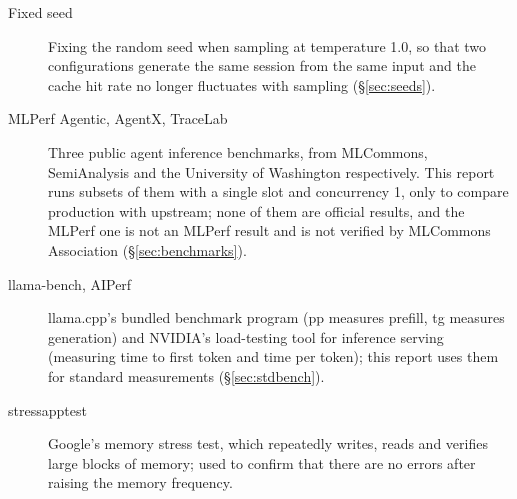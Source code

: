 \documentclass[11pt,a4paper]{article}
\begin{document}
\begin{description}
  \item[Fixed seed] Fixing the random seed when sampling at temperature 1.0, so that two configurations generate the same session from the same input and the cache hit rate no longer fluctuates with sampling (\S\ref{sec:seeds}).
  \item[MLPerf Agentic, AgentX, TraceLab] Three public agent inference benchmarks, from MLCommons, SemiAnalysis and the University of Washington respectively. This report runs subsets of them with a single slot and concurrency 1, only to compare production with upstream; none of them are official results, and the MLPerf one is not an MLPerf result and is not verified by MLCommons Association (\S\ref{sec:benchmarks}).
  \item[llama-bench, AIPerf] llama.cpp's bundled benchmark program (pp measures prefill, tg measures generation) and NVIDIA's load-testing tool for inference serving (measuring time to first token and time per token); this report uses them for standard measurements (\S\ref{sec:stdbench}).
  \item[stressapptest] Google's memory stress test, which repeatedly writes, reads and verifies large blocks of memory; used to confirm that there are no errors after raising the memory frequency.
\end{description}
\end{document}
